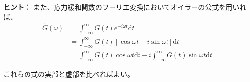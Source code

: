 \documentclass[uplatex,dvipdfmx,a4paper,11pt]{jsarticle}
\newcommand{\diff}{\mathrm d}
\begin{document}
\begin{enumerate}
\begin{itembox}[l]{{\bf ヒント：}}
また、応力緩和関数のフーリエ変換においてオイラーの公式を用いれば、
\begin{align*}
\tilde{G} (\omega) 
	&= \int_{-\infty}^{\infty} G(t) e^{-i\omega t} \diff t \\
	&= \int_{-\infty}^{\infty} G(t) [\cos \omega t - i \sin \omega t ] \diff t \\
	&= \int_{-\infty}^{\infty} G(t) \cos \omega t \diff t -i \int_{-\infty}^{\infty} G(t) \sin \omega t \diff t
\end{align*}

これらの式の実部と虚部を比べればよい。

\end{itembox}

\end{enumerate}

\newpage
\end{document}
